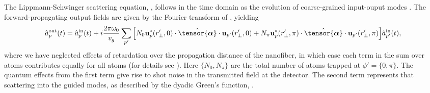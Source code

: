 \documentclass[preprint, aps,pra,onecolumn]{revtex4-1} %
\newcommand{\poltens}{\hat{\tensor{\boldsymbol{\alpha}}}}
\begin{document}
The Lippmann-Schwinger scattering equation, , follows in the time domain as the evolution of coarse-grained input-ouput modes \cite{gardiner_input_1985, fan_input-output_2010, le_kien_propagation_2014}.  
The forward-propagating output fields are given by the Fourier transform of , yielding \cite{le_kien_correlations_2008} 
\begin{align} \label{Eq::ScatteringSolution}
		\hat{a}^{\rm out}_{p}(t) = \hat{a}^{\rm in}_{p}(t) + i  \frac{2\pi \omega_0}{v_g}\sum_{p'}\Big[ N_0  \mathbf{u}^*_p(r'_\perp,0) \cdot \poltens \cdot  \mathbf{u}_{p'}(r'_\perp,0)  + N_\pi \mathbf{u}^*_p(r'_\perp,\pi) \cdot \poltens \cdot  \mathbf{u}_{p'}(r'_\perp,\pi) \Big] \hat{a}^{\rm in}_{p'}(t),
	\end{align} 
where we have neglected effects of retardation over the propagation distance of the nanofiber{\color{blue}, in which case each term in the sum over atoms contributes equally for all atoms} (for details see \cite{le_kien_correlations_2008, baragiola_open_2014}).  
Here $\{N_0,N_\pi \}$ are the total number of atoms trapped at $\phi' = \{0,\pi\}$. 
The quantum effects from the first term give rise to shot noise in the transmitted field at the detector.  
The second term represents that scattering into the guided modes, as described by the dyadic Green's function, .  
\end{document}
